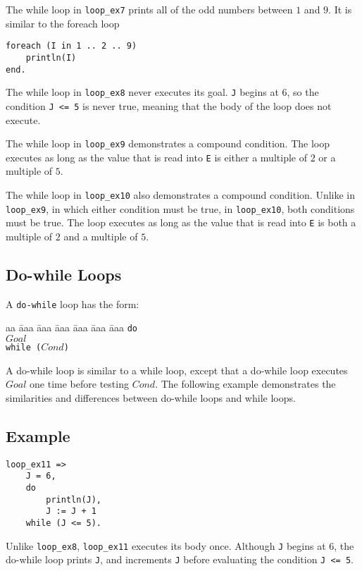 The while loop in \texttt{loop\_ex7} prints all of the odd numbers between $1$ and $9$.  It is similar to the foreach loop
\begin{verbatim}
foreach (I in 1 .. 2 .. 9)
    println(I)
end.
\end{verbatim}

The while loop in \texttt{loop\_ex8} never executes its goal.  \texttt{J} begins at $6$, so the condition \texttt{J <= 5} is never true, meaning that the body of the loop does not execute.

The while loop in \texttt{loop\_ex9} demonstrates a compound condition.  The loop executes as long as the value that is read into \texttt{E} is either a multiple of $2$ or a multiple of $5$.

The while loop in \texttt{loop\_ex10} also demonstrates a compound condition.  Unlike in \texttt{loop\_ex9}, in which either condition must be true, in \texttt{loop\_ex10}, both conditions must be true.  The loop executes as long as the value that is read into \texttt{E} is both a multiple of $2$ and a multiple of $5$. 

\subsection{Do-while Loops}
A \texttt{do-while} loop has the form:
\begin{tabbing}
aa \= aaa \= aaa \= aaa \= aaa \= aaa \= aaa \kill
\> \texttt{do} \\
\> \> $Goal$  \\
\>  \texttt{while ($Cond$)}
\end{tabbing} 
A do-while loop is similar to a while loop, except that a do-while loop executes $Goal$ one time before testing $Cond$.  The following example demonstrates the similarities and differences between do-while loops and while loops.
\subsection*{Example}
\begin{verbatim}
loop_ex11 =>
    J = 6,
    do
        println(J),
        J := J + 1
    while (J <= 5).
\end{verbatim}

Unlike \texttt{loop\_ex8}, \texttt{loop\_ex11} executes its body once.  Although \texttt{J} begins at $6$, the do-while loop prints \texttt{J}, and increments \texttt{J} before evaluating the condition \texttt{J <= 5}.

